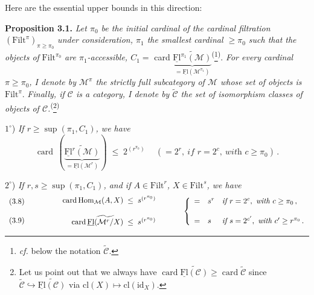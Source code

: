 \documentclass[11pt]{article}
\newcommand{\msp}[1]{\marginpar{\footnotesize [#1]}}
\newcommand{\uFl}{\underline{\mathrm{Fl}}}
\newcommand{\Filt}{\mathrm{Filt}}
\newcommand{\cM}{\mathcal{M}}
\newcommand{\card}{\operatorname{card}}
\newcommand{\pfn}[2]{\textsuperscript{(}\footnote[#1]{#2}\textsuperscript{)}}
\begin{document}
\msp{page 19}

Here are the essential upper bounds in this direction:

\textbf{Proposition 3.1.} \textit{Let $\pi_0$ be the initial cardinal of the cardinal filtration} $(\Filt^\pi)_{\pi\geq\pi_0}$ \textit{under consideration, $\pi_1$ the smallest cardinal $\geq\pi_0$ such that the objects of} $\Filt^{\pi_0}$ \textit{are $\pi_1$-accessible, $C_1=$} card $\underbrace{\widetilde{\uFl^{\pi_1}(\cM)}}_{=\uFl(\cM^{\pi_1})}$\pfn{4}{\textit{cf.} below the notation $\widetilde{\mathcal{C}}$.}. \textit{For every cardinal $\pi\geq\pi_0$, I denote by $\cM^\pi$ the strictly full subcategory of $\cM$ whose set of objects is} $\Filt^\pi$. \textit{Finally, if $\mathcal{C}$ is a category, I denote by $\widetilde{\mathcal{C}}$ the set of isomorphism classes of objects of $\mathcal{C}$.}\pfn{5}{Let us point out that we always have $\card\widetilde{\uFl(\mathcal{C})}\geq\card\widetilde{\mathcal{C}}$ since $\widetilde{\mathcal{C}}\hookrightarrow\widetilde{\uFl(\mathcal{C})}$ via $\mathrm{cl}(X)\longmapsto\mathrm{cl}(\mathrm{id}_X)$.}

$1^\circ$) \textit{If $r\geq\sup(\pi_1,C_1)$, we have}
\[
\card\,(\underbrace{\widetilde{\uFl^r(\cM)}}_{=\uFl(\cM^r)}) \;\leq\; 2^{(r^{\pi_0})} \quad\ (=2^r,\ \textit{if } r=2^c,\ \textit{with } c\geq\pi_0)\,.
\tag*{(3.7)}
\]

$2^\circ$) \textit{If $r,s\geq\sup(\pi_1,C_1)$, and if $A\in\Filt^r$, $X\in\Filt^s$, we have}
\[
\begin{array}{l}
\text{(3.8)}\\[3ex]
\text{(3.9)}
\end{array}
\qquad\qquad
\begin{array}{r@{\;\;\leq\;\;}l}
\card\mathrm{Hom}_{\cM}(A,X) & s^{(r^{\pi_0})}\\[3ex]
\card\widetilde{\uFl(\cM^r/X)} & s^{(r^{\pi_0})}
\end{array}
\qquad\quad
\left\{
\begin{array}{lll}
= & s^r & \textit{if } r=2^c,\ \textit{with } c\geq\pi_0\,,\\[3ex]
= & s & \textit{if } s=2^{c'},\ \textit{with } c'\geq r^{\pi_0}\,.
\end{array}
\right.
\]
\end{document}
